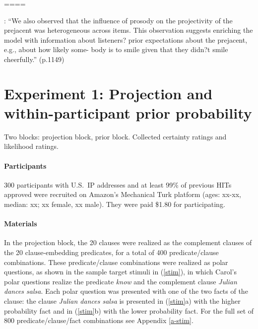 \documentclass[11pt,fleqn]{article}
\newcommand{\6}{\mbox{$[\hspace*{-.6mm}[$}}
\newcommand{\9}{\mbox{$]\hspace*{-.6mm}]$}}
\begin{document}
\citet{mahler2020}

====

\citealt{stevens-etal2017}: ``We also observed that the influence of prosody on the projectivity of the prejacent was heterogeneous across items. This observation suggests enriching the model with information about listeners? prior expectations about the prejacent, e.g., about how likely some- body is to smile given that they didn?t smile cheerfully.'' (p.1149)

\newpage

\section{Experiment 1: Projection and within-participant prior probability}

Two blocks: projection block, prior block. Collected certainty ratings and likelihood ratings.

\paragraph{Participants} 300 participants with U.S.\ IP addresses and at least 99\% of previous HITs approved were recruited on Amazon's Mechanical Turk platform (ages: xx-xx, median: xx; xx female, xx male). They were paid \$1.80 for participating.

\paragraph{Materials} In the projection block, the 20 clauses were realized as the complement clauses of the 20 clause-embedding predicates, for a total of 400 predicate/clause combinations. These predicate/clause combinations were realized as polar questions, as shown in the sample target stimuli in (\ref{stim}), in which Carol's polar questions realize the predicate {\em know} and the complement clause {\em Julian dances salsa}. Each polar question was presented with one of the two facts of the clause: the clause {\em Julian dances salsa} is presented in (\ref{stim}a) with the higher probability fact and in (\ref{stim}b) with the lower probability fact. For the full set of 800 predicate/clause/fact combinations see Appendix \ref{a-stim}.
\end{document}
